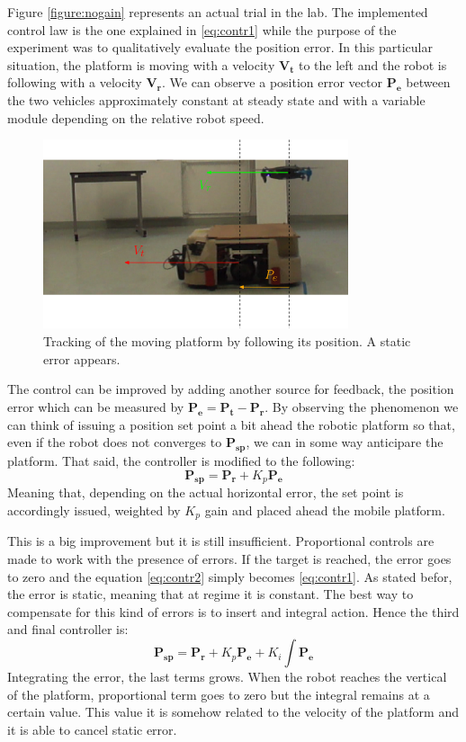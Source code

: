 Figure \ref{figure:nogain} represents an actual trial in the lab. The implemented control law is the one explained in \ref{eq:contr1} while the purpose of the experiment was to qualitatively evaluate the position error. In this particular situation, the platform is moving with a velocity $\boldsymbol{V_t}$ to the left and the robot is following with a velocity $\boldsymbol{V_r}$. We can observe a position error vector $\boldsymbol{P_e}$ between the two vehicles approximately constant at steady state and with a variable module depending on the relative robot speed.
\begin{figure}[h]
 \centering
   \includegraphics[width = 0.8\textwidth ]{tracknogain2.eps}
    \caption[Tracking with no gain]{Tracking of the moving platform by following its position. A static error appears.}
   \label{figure:static}
\end{figure}
The control can be improved by adding  another source for feedback, the position error which can be measured by $\boldsymbol{P_e} = \boldsymbol{P_{t}} - \boldsymbol{P_{r}}$. By observing the phenomenon we can think of issuing a position set point a bit ahead the robotic platform so that, even if the robot does not converges to $\boldsymbol{P_{sp}}$, we can in some way anticipare the platform. That said, the controller is modified to the following:
\begin{equation}
\boldsymbol{P_{sp}} = \boldsymbol{P_{r}} + K_p \boldsymbol{P_e} 
\label{eq:contr2}
\end{equation}
Meaning that, depending on the actual horizontal error, the set point is accordingly issued, weighted by $K_p$ gain and placed ahead the mobile platform. 

This is a big improvement but it is still insufficient. Proportional controls are made to work with the presence of errors. If the target is reached, the error goes to zero and the equation \ref{eq:contr2} simply becomes \ref{eq:contr1}. As stated befor, the error is static, meaning that at regime it is constant. The best way to compensate for this kind of errors is to insert and integral action. Hence the third and final controller is:
\begin{equation}
\boldsymbol{P_{sp}} = \boldsymbol{P_{r}} + K_p \boldsymbol{P_e} +  K_i \int \boldsymbol{P_e}
\label{eq:contr3}
\end{equation}
Integrating the error, the last terms grows. When the robot reaches the vertical of the platform, proportional term goes to zero but the integral remains at a certain value. This value it is somehow related to the velocity of the platform and it is able to cancel static error.

